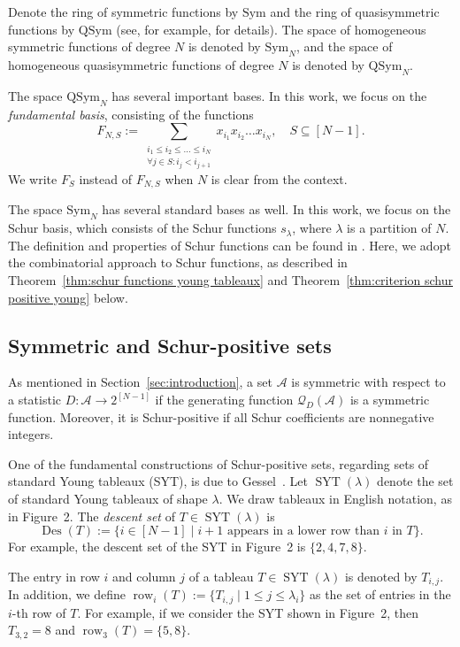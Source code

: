 \documentclass[11pt]{article}
\theoremstyle{definition}
\numberwithin{equation}{section}
\newcommand{\sym}{\mathrm{Sym}}
\newcommand{\qsym}{\mathrm{QSym}}
\newcommand{\Des}{\operatorname{Des}}
\newcommand{\Syt}{\operatorname{SYT}}
\newcommand{\row}{\operatorname{row}}
\newcommand{\Q}{\mathcal{Q}}
\newcommand{\A}{\mathcal{A}}
\begin{document}
Denote the ring of symmetric functions by $\sym$ and the ring of quasisymmetric functions by $\qsym$ (see, for example, \cite[Section 1]{S3_patterns_list} for details). The space of homogeneous symmetric functions of degree $N$ is denoted by $\sym_N$, and the space of homogeneous quasisymmetric functions of degree $N$ is denoted by $\qsym_N$.

The space $\qsym_N$ has several important bases. In this work, we focus on the \emph{fundamental basis}, consisting of the functions
\[
    F_{N,S} := \sum_{\substack{i_1 \le i_2 \le \dots \le i_N \\ \forall j \in S:i_j < i_{j+1}}} x_{i_1} x_{i_2} \dots x_{i_N},\quad S \subseteq [N - 1].
\]
We write $F_S$ instead of $F_{N,S}$ when $N$ is clear from the context.

The space $\sym_N$ has several standard bases as well. In this work, we focus on the Schur basis, which consists of the Schur functions $s_{\lambda}$, where $\lambda$ is a partition of $N$. 
The definition and properties of Schur functions can be found in \cite[Section 4.4]{sagan_book}. Here, we adopt the combinatorial approach to Schur functions, as described in Theorem~\ref{thm:schur functions young tableaux} and Theorem~\ref{thm:criterion schur positive young} below.

\subsection{Symmetric and Schur-positive sets}
\label{subsec:schur positive sets}
As mentioned in Section~\ref{sec:introduction}, a set $\A$ is symmetric with respect to a statistic $D:\A \to 2^{[N-1]}$ if the generating function $\Q_{D}(\A)$ is a symmetric function. Moreover, it is Schur-positive if all Schur coefficients are nonnegative integers.


One of the fundamental constructions of Schur-positive sets, regarding sets of standard Young tableaux (SYT), is due to Gessel~\cite{knuth_classes_schur_positive}. Let $\Syt(\lambda)$ denote the set of standard Young tableaux of shape $\lambda$. We draw tableaux in English notation, as in Figure~2. The \emph{descent set} of $T\in \Syt(\lambda)$ is
\[
    \Des(T) := \{i \in [N-1] \mid i+1 \text{ appears in a lower row than $i$ in $T$}\}.
\]
For example, the descent set of the SYT in Figure~2 is $\{2,4,7,8\}$.

The entry in row $i$ and column $j$ of a tableau $T \in \Syt(\lambda)$ is denoted by $T_{i,j}$. In addition, we define $\row_i(T) := \{T_{i,j} \mid 1 \le j \le \lambda_i\}$ as the set of entries in the $i$-th row of $T$. For example, if we consider the SYT shown in Figure~2, then $T_{3,2} = 8$ and $\row_3(T) = \{5,8\}$.
\end{document}
